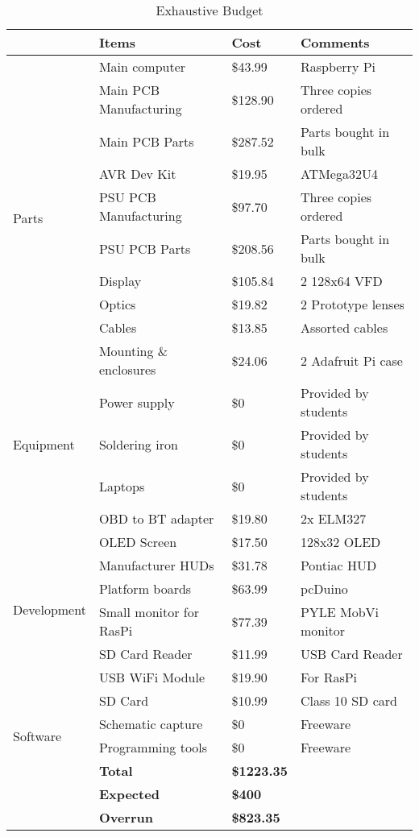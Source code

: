 \begin{table}
\centering
\begin{tabular}{|l|l|l|l|}
\hline
 & Items & Cost & Comments \\ \hline
\multirow{10}{*}{Parts}
 & Main computer            & \$43.99  & Raspberry Pi \cite{raspifaq} \\
 & Main PCB Manufacturing   & \$128.90 & Three copies ordered \\
 & Main PCB Parts           & \$287.52 & Parts bought in bulk \\
 & AVR Dev Kit              & \$19.95  & ATMega32U4 \cite{atmega32u4ds} \\
 & PSU PCB Manufacturing    & \$97.70  & Three copies ordered \\
 & PSU PCB Parts            & \$208.56 & Parts bought in bulk \\
 & Display                  & \$105.84  & 2 128x64  VFD \\
 & Optics                   & \$19.82  & 2 Prototype lenses \\
 & Cables                   & \$13.85  & Assorted cables \\
 & Mounting \& enclosures   & \$24.06  & 2 Adafruit Pi case \\ \hline
\multirow{3}{*}{Equipment}
 & Power supply             & \$0   & Provided by students \\
 & Soldering iron           & \$0   & Provided by students \\
 & Laptops                  & \$0   & Provided by students \\ \hline
\multirow{8}{*}{Development}
 & OBD to BT adapter        & \$19.80 & 2x ELM327 \\
 & OLED Screen              & \$17.50 & 128x32 OLED \\
 & Manufacturer HUDs        & \$31.78 & Pontiac HUD \\
 & Platform boards          & \$63.99 & pcDuino \\
 & Small monitor for RasPi  & \$77.39 & PYLE MobVi monitor \\
 & SD Card Reader           & \$11.99 & USB Card Reader \\
 & USB WiFi Module          & \$19.90 & For RasPi \\
 & SD Card                  & \$10.99 & Class 10 SD card \\
\multirow{2}{*}{Software}
 & Schematic capture        & \$0   & Freeware \\
 & Programming tools        & \$0   & Freeware \\ \hline

& \textbf{Total}    & \textbf{\$1223.35 } & \\ \hline
& \textbf{Expected} & \textbf{\$400 } & \\ \hline
& \textbf{Overrun} &  \textbf{\$823.35 } & \\ \hline
\end{tabular}
\caption{Exhaustive Budget}
\label{tab:budget}
\end{table}

